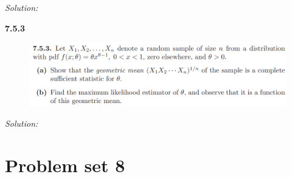 \documentclass{book}
\theoremstyle{definition}
\begin{document}
\noindent \textit{Solution:}



\newpage





\noindent\textbf{7.5.3}
\begin{figure}[!htb]
	\centering
	\includegraphics[scale=1]{753}
\end{figure}
\noindent \textit{Solution:}
\newpage






\section{Problem set 8}




\newpage

	
	
\end{document}
